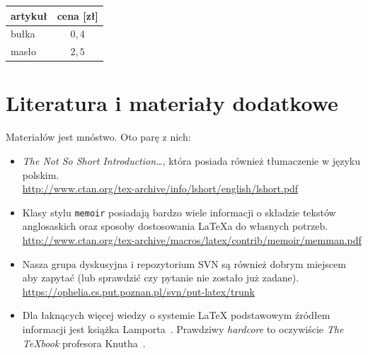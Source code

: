 \begin{table}[h]
    \label{tab:tabela2}
    \centering\footnotesize%
    \begin{tabular}{l c}
        \toprule
        artykuł & cena [zł] \\
        \midrule
        bułka & $0,4$ \\
        masło & $2,5$ \\
        \bottomrule
    \end{tabular}
\end{table}


\section{Literatura i materiały dodatkowe}

Materiałów jest mnóstwo. Oto parę z nich:
\begin{itemize}
    \item \emph{The Not So Short Introduction\ldots}, która posiada również tłumaczenie
    w języku polskim.\\
    \url{http://www.ctan.org/tex-archive/info/lshort/english/lshort.pdf}

    \item Klasy stylu \texttt{memoir} posiadają bardzo wiele informacji o składzie tekstów
    anglosaskich oraz sposoby dostosowania \LaTeX{}a do własnych potrzeb.\\
    \url{http://www.ctan.org/tex-archive/macros/latex/contrib/memoir/memman.pdf}

    \item Nasza grupa dyskusyjna i repozytorium SVN są również dobrym miejscem aby zapytać
    (lub sprawdzić czy pytanie nie zostało już zadane).\\
    \url{https://ophelia.cs.put.poznan.pl/svn/put-latex/trunk}

    \item Dla łaknących więcej wiedzy o systemie \LaTeX{} podstawowym źródłem informacji
    jest książka Lamporta~\cite{Lamport:LDP85}. Prawdziwy \emph{hardcore} to oczywiście
    \emph{The \TeX{}book} profesora Knutha~\cite{Knuth:ct-a}.
\end{itemize}

